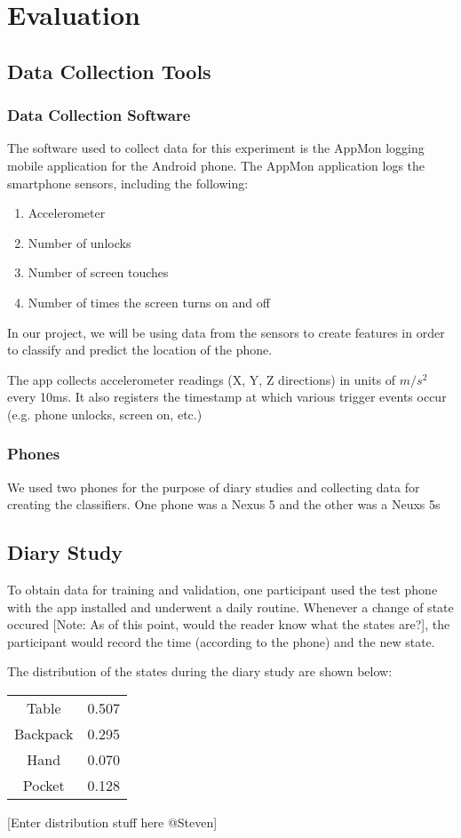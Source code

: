 \section{Evaluation}

\subsection{Data Collection Tools}
\subsubsection{Data Collection Software}
The software used to collect data for this experiment is the AppMon logging mobile application 
for the Android phone. 
The AppMon application logs the smartphone sensors, including the following:
\begin{enumerate}
\item Accelerometer
\item Number of unlocks
\item Number of screen touches
\item Number of times the screen turns on and off
\end{enumerate}

In our project, we will be using data from the sensors
to create features in order to classify and predict the location of the phone. 

The app collects accelerometer readings (X, Y, Z directions) in units of $m/s^2$ every 10ms.
It also registers the timestamp at which various trigger events occur (e.g. phone unlocks, screen on, etc.)

\subsubsection{Phones}
We used two phones for the purpose of diary studies and collecting data for creating the classifiers.
One phone was a Nexus 5 and the other was a Neuxs 5s


\subsection {Diary Study}
To obtain data for training and validation, one participant used the test phone with the app installed 
and underwent a daily routine.
Whenever a change of state occured [Note: As of this point, would the reader know what the states are?], the participant would record the time (according to the phone) and the new state.


The distribution of the states during the diary study are shown below:


\begin{center}
\begin{tabular}{ |c|c| } 
 \hline
 Table & 0.507 \\ 
 Backpack & 0.295 \\ 
 Hand & 0.070 \\ 
 Pocket & 0.128 \\
 \hline
\end{tabular}
\end{center}
[Enter distribution stuff here @Steven]